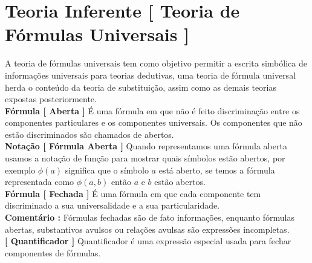 \documentclass[10pt,a4paper]{report}
\begin{document}

\section{Teoria Inferente [ Teoria de Fórmulas Universais ]}

\hspace{\baselineskip}

A teoria de fórmulas universais tem como objetivo permitir a escrita simbólica de informações universais para teorias dedutivas, uma teoria de fórmula universal herda o conteúdo da teoria de substituição, assim como as demais teorias expostas posteriormente.\\

\textbf{Fórmula [ Aberta ]} É uma fórmula em que não é feito discriminação entre os componentes particulares e os componentes universais. Os componentes que não estão discriminados são chamados de abertos.\\

\textbf{Notação [ Fórmula Aberta ]} Quando representamos uma fórmula aberta usamos a notação de função para mostrar quais símbolos estão abertos, por exemplo $ \phi(a) $ significa que o símbolo $a$ está aberto, se temos a fórmula representada como $\phi(a,b)$ então $a$ e $b$ estão abertos. \\

\textbf{Fórmula [ Fechada ]} É uma fórmula em que cada componente tem discriminado a sua universalidade e a sua particularidade.\\

\textbf{Comentário :} Fórmulas fechadas são de fato informações, enquanto fórmulas abertas, substantivos avulsos ou relações avulsas são expressões incompletas.\\

\textbf{[ Quantificador ]} Quantificador é uma expressão especial usada para fechar componentes de fórmulas.\\
\end{document}
